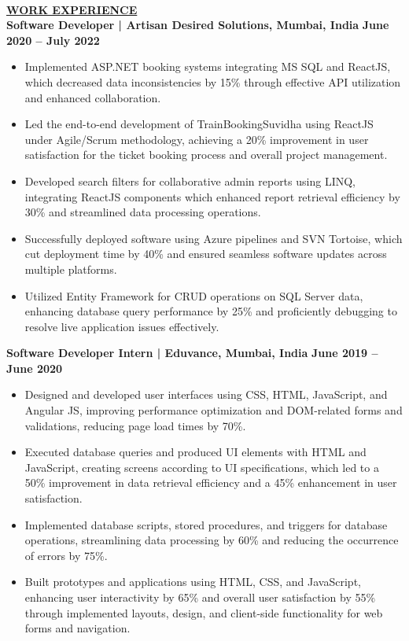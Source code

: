 \documentclass{article}
\begin{document}
\\

\noindent \textbf{\underline{WORK EXPERIENCE}} \\
\noindent \textbf{Software Developer | Artisan Desired Solutions, Mumbai, India}  \hfill \textbf{June 2020 – July 2022}
\begin{itemize}[noitemsep,nolistsep,leftmargin=*]
\item {\small Implemented ASP.NET booking systems integrating MS SQL and ReactJS, which decreased data inconsistencies by 15\% through effective API utilization and enhanced collaboration.}
\item {\small Led the end-to-end development of TrainBookingSuvidha using ReactJS under Agile/Scrum methodology, achieving a 20\% improvement in user satisfaction for the ticket booking process and overall project management.}
\item {\small Developed search filters for collaborative admin reports using LINQ, integrating ReactJS components which enhanced report retrieval efficiency by 30\% and streamlined data processing operations.}
\item {\small Successfully deployed software using Azure pipelines and SVN Tortoise, which cut deployment time by 40\% and ensured seamless software updates across multiple platforms.}
\item {\small Utilized Entity Framework for CRUD operations on SQL Server data, enhancing database query performance by 25\% and proficiently debugging to resolve live application issues effectively.}
\end{itemize}

\vspace{1mm}

\noindent \textbf{Software Developer Intern | Eduvance, Mumbai, India}  \hfill \textbf{June 2019 – June 2020}
\begin{itemize}[noitemsep,nolistsep,leftmargin=*]
\item {\small Designed and developed user interfaces using CSS, HTML, JavaScript, and Angular JS, improving performance optimization and DOM-related forms and validations, reducing page load times by 70\%.}
\item {\small Executed database queries and produced UI elements with HTML and JavaScript, creating screens according to UI specifications, which led to a 50\% improvement in data retrieval efficiency and a 45\% enhancement in user satisfaction.}
\item {\small Implemented database scripts, stored procedures, and triggers for database operations, streamlining data processing by 60\% and reducing the occurrence of errors by 75\%.}
\item {\small Built prototypes and applications using HTML, CSS, and JavaScript, enhancing user interactivity by 65\% and overall user satisfaction by 55\% through implemented layouts, design, and client-side functionality for web forms and navigation.}\\
\end{itemize}
\end{document}

